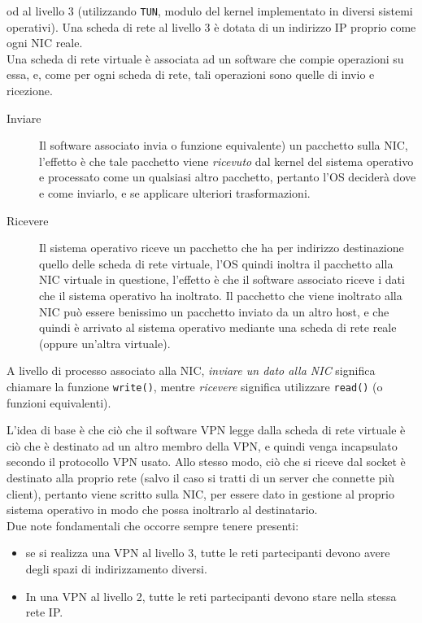 od al livello 3 (utilizzando \texttt{TUN}, modulo del
kernel implementato in diversi sistemi operativi). Una scheda di rete
al livello 3 è dotata di un indirizzo IP proprio come ogni NIC reale.\\
Una scheda di rete virtuale è associata ad un software che compie operazioni su essa,
e, come per ogni scheda di rete, tali operazioni sono quelle di invio e ricezione.
\begin{description}
  \item[Inviare]Il software associato invia
  o funzione equivalente) un pacchetto sulla NIC, l'effetto è che tale
  pacchetto viene \textit{ricevuto} dal kernel del sistema operativo e processato
  come un qualsiasi altro pacchetto, pertanto l'OS deciderà
  dove e come inviarlo, e se applicare ulteriori trasformazioni.
  \item[Ricevere]Il sistema operativo riceve un pacchetto che ha per indirizzo destinazione
  quello delle scheda di rete virtuale, l'OS quindi inoltra il pacchetto alla NIC
  virtuale in questione, l'effetto è che il software associato riceve i dati
  che il sistema operativo ha inoltrato. Il pacchetto che viene inoltrato alla NIC
  può essere benissimo un pacchetto inviato da un altro host, e che quindi è arrivato
  al sistema operativo mediante una scheda di rete reale (oppure un'altra virtuale).
\end{description}
A livello di processo associato alla NIC, \textit{inviare un dato alla NIC} significa
chiamare la funzione \texttt{write()}, mentre \textit{ricevere} significa
utilizzare \texttt{read()} (o funzioni equivalenti).


L'idea di base è che ciò che il software VPN legge dalla scheda di rete virtuale
è ciò che è destinato ad un altro membro della VPN, e quindi venga incapsulato secondo
il protocollo VPN usato. Allo stesso modo, ciò che si riceve dal socket è destinato
alla proprio rete (salvo il caso si tratti di un server che connette più client), pertanto
viene scritto sulla NIC, per essere dato in gestione al proprio sistema operativo in
modo che possa inoltrarlo al destinatario.\\
Due note fondamentali che occorre sempre tenere presenti:
\begin{itemize}
  \item se si realizza una VPN al livello 3, tutte le reti partecipanti devono
  avere degli spazi di indirizzamento diversi.
  \item In una VPN al livello 2, tutte le reti partecipanti devono stare
  nella stessa rete IP.
\end{itemize}


